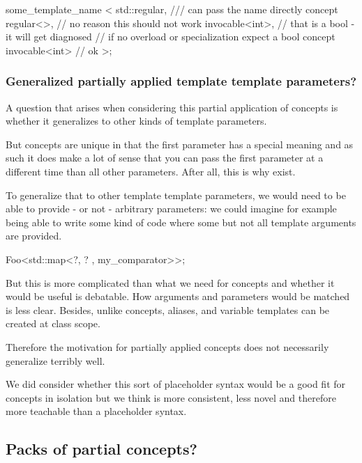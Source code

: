 \documentclass{wg21}
\begin{document}
\begin{colorblock}
some_template_name <
    std::regular,  /// can pass the name directly
    concept regular<>, // no reason this should not work
    invocable<int>, // that is a bool - it will get diagnosed
                    // if no overload or specialization expect a bool
    concept invocable<int> // ok
>;
\end{colorblock}

\subsubsection{Generalized partially applied template template parameters?}

A question that arises when considering this partial application of concepts is whether it generalizes to other kinds of template parameters.

But concepts are unique in that the first parameter has a special meaning and as such it does make a lot of sense
that you can pass the first parameter at a different time than all other parameters.
After all, this is why  exist.

To generalize that to other template template parameters, we would need to be able
to provide - or not - arbitrary parameters:
we could imagine for example being able to write some kind of code where some but not all template arguments are provided.

\begin{colorblock}
Foo<std::map<?, ? , my_comparator>>;
\end{colorblock}

But this is more complicated than what we need for concepts and whether it would be useful is debatable.
How arguments and parameters would be matched is less clear.
Besides, unlike concepts, aliases, and variable templates can be created at class scope.

Therefore the motivation for partially applied concepts does not necessarily generalize terribly well.

We did consider whether this sort of placeholder syntax would be a good fit for concepts in isolation but
we think  is more consistent, less novel and
therefore more teachable than a placeholder syntax.

\subsection{Packs of partial concepts?}
\end{document}
